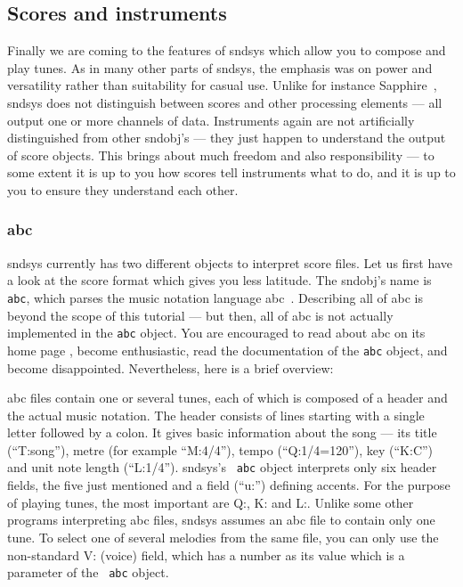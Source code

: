 \documentclass{article}
\def\s{{\sc sndsys} }
\def\sn{{\sc sndsys}}
\begin{document}
\subsection{Scores and instruments}
\label{sec:scores}

Finally we are coming to the features of \s which allow you to compose and play
tunes.  As in many other parts of \sn, the emphasis was on power and
versatility rather than suitability for casual use.  Unlike for instance
Sapphire~\cite{sapphire}, \s does not distinguish between scores and other
processing elements --- all output one or more channels of data.  Instruments
again are not artificially distinguished from other sndobj's --- they just
happen to understand the output of score objects.  This brings about much
freedom and also responsibility --- to some extent it is up to you how scores
tell instruments what to do, and it is up to you to ensure they understand each
other.

\subsubsection{abc}

urrently has two different objects to interpret score files.  Let us first
have a look at the score format which gives you less latitude.  The sndobj's
name is {\tt abc}, which parses the music notation language abc~\cite{abc}.
Describing all of abc is beyond the scope of this tutorial --- but then, all of
abc is not actually implemented in the {\tt abc} object.  You are encouraged
to read about abc on its home page \cite{abc}, become enthusiastic, read the
documentation of the {\tt abc} object, and become disappointed.  Nevertheless,
here is a brief overview:

abc files contain one or several tunes, each of which is composed of a header
and the actual music notation.  The header consists of lines starting with a
single letter followed by a colon.  It gives basic information about the song
--- its title (``T:song''), metre (for example ``M:4/4''), tempo
(``Q:1/4=120''), key (``K:C'') and unit note length (``L:1/4'').  \sn's {\tt
abc} object interprets only six header fields, the five just mentioned and a
field (``u:'') defining accents.  For the purpose of playing tunes, the most
important are Q:, K: and L:.  Unlike some other programs interpreting abc
files, \s assumes an abc file to contain only one tune.  To select one of
several melodies from the same file, you can only use the non-standard V:
(voice) field, which has a number as its value which is a parameter of the {\tt
abc} object.
\end{document}
